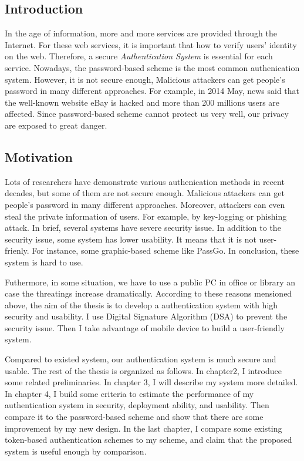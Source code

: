 
\begin{CJK}{Bg5}{bsmi}



\chapter{Introduction}

In the age of information, more and more services are provided through the Internet. For these web services, it is important that how to verify users' identity on the web. Therefore, a secure \emph{Authentication System} is essential for each service. Nowadays, the password-based scheme is the most common authenication system. However, it is not secure enough, Malicious attackers can get people's password in many different approaches. For example, in 2014 May, news said that the well-known website eBay is hacked and more than 200 millions users are affected. Since password-based scheme cannot protect us very well, our privacy are exposed to great danger.

\section{Motivation}

Lots of researchers have demonstrate various authenication methods in recent decades, but some of them are not secure enough. Malicious attackers can get people's password in many different approaches. Moreover, attackers can even steal the private information of users. For example, by key-logging or phishing attack. In brief, several systems have severe security issue. In addition to the security issue, some system has lower usability. It means that it is not user-frienly. For instance, some graphic-based scheme like PassGo. In conclusion, these system is hard to use.

Futhermore, in some situation, we have to use a public PC in office or library an case the threatings increase dramatically. According to these reasons mensioned above, the aim of the thesis is to develop a authentication system with high security and usability. I use Digital Signature Algorithm (DSA) to prevent the security issue. Then I take advantage of mobile device to build a user-friendly system.

Compared to existed system, our authentication system is much secure and usable. The rest of the thesis is organized as follows. In chapter2, I introduce some related preliminaries. In chapter 3, I will describe my system more detailed. In chapter 4, I build some criteria to estimate the performance of my authentication system in security, deployment ability, and usability. Then compare it to the password-based scheme and show that there are some improvement by my new design. In the last chapter, I compare some existing token-based authentication schemes to my scheme, and claim that the proposed system is useful enough by comparison.

\end{CJK}
